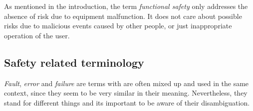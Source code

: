 As mentioned in the introduction, the term \emph{functional safety} only addresses the absence of risk due to equipment malfunction. It does not care about possible risks due to malicious events caused by other people, or just inappropriate operation of the user.


\subsection{Safety related terminology}

\label{sec:fault,error,failure}
\emph{Fault}, \emph{error} and \emph{failure} are terms with are often mixed up and used in the same context, since they seem to be very similar in their meaning. Nevertheless, they stand for different things and its important to be aware of their disambiguation.


